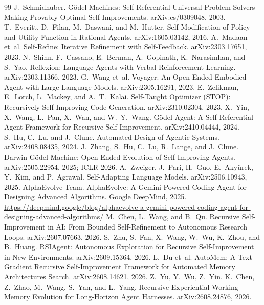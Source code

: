 \documentclass[11pt,a4paper]{article}
\begin{document}
\small
\begin{thebibliography}{99}\setlength{\itemsep}{1pt}
 J.~Schmidhuber. G\"odel Machines: Self-Referential Universal Problem Solvers Making Provably Optimal Self-Improvements. arXiv:cs/0309048, 2003.
 T.~Everitt, D.~Filan, M.~Daswani, and M.~Hutter. Self-Modification of Policy and Utility Function in Rational Agents. arXiv:1605.03142, 2016.
 A.~Madaan et~al. Self-Refine: Iterative Refinement with Self-Feedback. arXiv:2303.17651, 2023.
 N.~Shinn, F.~Cassano, E.~Berman, A.~Gopinath, K.~Narasimhan, and S.~Yao. Reflexion: Language Agents with Verbal Reinforcement Learning. arXiv:2303.11366, 2023.
 G.~Wang et~al. Voyager: An Open-Ended Embodied Agent with Large Language Models. arXiv:2305.16291, 2023.
 E.~Zelikman, E.~Lorch, L.~Mackey, and A.~T.~Kalai. Self-Taught Optimizer (STOP): Recursively Self-Improving Code Generation. arXiv:2310.02304, 2023.
 X.~Yin, X.~Wang, L.~Pan, X.~Wan, and W.~Y.~Wang. G\"odel Agent: A Self-Referential Agent Framework for Recursive Self-Improvement. arXiv:2410.04444, 2024.
 S.~Hu, C.~Lu, and J.~Clune. Automated Design of Agentic Systems. arXiv:2408.08435, 2024.
 J.~Zhang, S.~Hu, C.~Lu, R.~Lange, and J.~Clune. Darwin G\"odel Machine: Open-Ended Evolution of Self-Improving Agents. arXiv:2505.22954, 2025; ICLR 2026.
 A.~Zweiger, J.~Pari, H.~Guo, E.~Aky\"urek, Y.~Kim, and P.~Agrawal. Self-Adapting Language Models. arXiv:2506.10943, 2025.
 AlphaEvolve Team. AlphaEvolve: A Gemini-Powered Coding Agent for Designing Advanced Algorithms. Google DeepMind, 2025. \url{https://deepmind.google/blog/alphaevolve-a-gemini-powered-coding-agent-for-designing-advanced-algorithms/}
 M.~Chen, L.~Wang, and B.~Qu. Recursive Self-Improvement in AI: From Bounded Self-Refinement to Autonomous Research Loops. arXiv:2607.07663, 2026.
 S.~Zhu, S.~Fan, X.~Wang, W.~Wu, K.~Zhou, and B.~Huang. RSIAgent: Autonomous Exploration for Recursive Self-Improvement in New Environments. arXiv:2609.15364, 2026.
 L.~Du et~al. AutoMem: A Text-Gradient Recursive Self-Improvement Framework for Automated Memory Architectures Search. arXiv:2608.14621, 2026.
 Z.~Yu, Y.~Wu, Z.~Yin, K.~Chen, Z.~Zhao, M.~Wang, S.~Yan, and L.~Yang. Recursive Experiential-Working Memory Evolution for Long-Horizon Agent Harnesses. arXiv:2608.24876, 2026.

\end{thebibliography}
\end{document}

